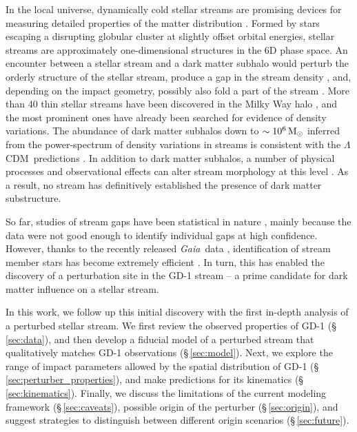 \documentclass[twocolumn]{aastex62}
\newcommand{\acronym}[1]{{\small{#1}}}
\newcommand{\gaia}{\textsl{Gaia}}
\newcommand{\lcdm}{\acronym{$\Lambda$CDM}}
\begin{document}
In the local universe, dynamically cold stellar streams are promising devices for measuring detailed properties of the matter distribution \citep[e.g.,][]{johnston1999, bh2018}.
Formed by stars escaping a disrupting globular cluster at slightly offset orbital energies, stellar streams are approximately one-dimensional structures in the 6D phase space.
An encounter between a stellar stream and a dark matter subhalo would perturb the orderly structure of the stellar stream, produce a gap in the stream density \citep[e.g.,][]{carlberg2012}, and, depending on the impact geometry, possibly also fold a part of the stream \citep[e.g.,][]{yoon2011}.
More than 40 thin stellar streams have been discovered in the Milky Way halo \citep{gc2016}, and the most prominent ones have already been searched for evidence of density variations.
The abundance of dark matter subhalos down to $\sim10^6\,\rm M_\odot$ inferred from the power-spectrum of density variations in streams is consistent with the \lcdm\ predictions \citep[e.g.,][]{carlberg2012,cg2013}.
In addition to dark matter subhalos, a number of physical processes and observational effects can alter stream morphology at this level \citep[e.g.,][]{kupper2008, amorisco2016, ibata2016}.
As a result, no stream has definitively established the presence of dark matter substructure.

So far, studies of stream gaps have been statistical in nature \citep[e.g.,][]{erkal2017}, mainly because the data were not good enough to identify individual gaps at high confidence.
However, thanks to the recently released \gaia\ data \citep{gdr2}, identification of stream member stars has become extremely efficient \citep[e.g.,][]{malhan2018}.
In turn, this has enabled the discovery of a perturbation site in the GD-1 stream \citep{pwb} -- a prime candidate for dark matter influence on a stellar stream.

In this work, we follow up this initial discovery with the first in-depth analysis of a perturbed stellar stream.
We first review the observed properties of GD-1 (\S\,\ref{sec:data}), and then develop a fiducial model of a perturbed stream that qualitatively matches GD-1 observations (\S\,\ref{sec:model}).
Next, we explore the range of impact parameters allowed by the spatial distribution of GD-1 (\S\,\ref{sec:perturber_properties}), and make predictions for its kinematics (\S\,\ref{sec:kinematics}).
Finally, we discuss the limitations of the current modeling framework (\S\,\ref{sec:caveats}), possible origin of the perturber (\S\,\ref{sec:origin}), and suggest strategies to distinguish between different origin scenarios (\S\,\ref{sec:future}).
\end{document}
